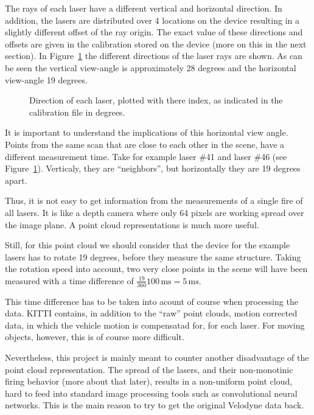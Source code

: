 \documentclass[english]{article}
\begin{document}
The rays of each laser have a different vertical and horizontal
direction. In addition, the lasers are distributed over 4 locations on
the device resulting in a slightly different offset of the ray origin.
The exact value of these directions and offsets are given in the
calibration stored on the device (more on this in the next section).
In Figure~\ref{fig:directions} the different directions of the laser
rays are shown. As can be seen the vertical view-angle is approximately
28 degrees and the horizontal view-angle 19 degrees.

\begin{figure}
    \centering
    \def\svgwidth{\columnwidth}
    \scalebox{0.9}{
    \def\svgwidth{.6 \columnwidth}
      
    }
    \caption{Direction of each laser, plotted with there index, as
    indicated in the calibration file in degrees.}
		\label{fig:directions}
\end{figure}

It is important to understand the implications of this horizontal view
angle. Points from the same scan that are close to each other in the
scene, have a different measurement time. Take for example laser \#41
and laser \#46 (see Figure~\ref{fig:directions}). Verticaly, they are
``neighbors'', but horizontally they are 19 degrees apart.

Thus, it is not easy to get information from the measurements of a
single fire of all lasers. It is like a depth camera where only 64
pixels are working spread over the image plane. A point cloud
representations is much more useful.

Still, for this point cloud we should consider that the device for the
example lasers has to rotate 19 degrees, before they measure the same
structure. Taking the rotation speed into account, two very close points
in the scene will have been measured with a time difference of
$\frac{19}{360} 100 \, \mbox{ms}= 5 \, \mbox{ms}$.

This time difference has to be taken into acount of course when
processing the data. KITTI contains, in addition to the ``raw'' point
clouds, motion corrected data, in which the vehicle motion is
compensatad for, for each laser. For moving objects, however, this is of
course more difficult.

Nevertheless, this project is mainly meant to counter another
disadvantage of the point cloud representation. The spread of the
lasers, and their non-monotinic firing behavior (more about that later),
results in a non-uniform point cloud, hard to feed into standard image
processing tools such as convolutional neural networks. This is the main
reason to try to get the original Velodyne data back.
\end{document}
